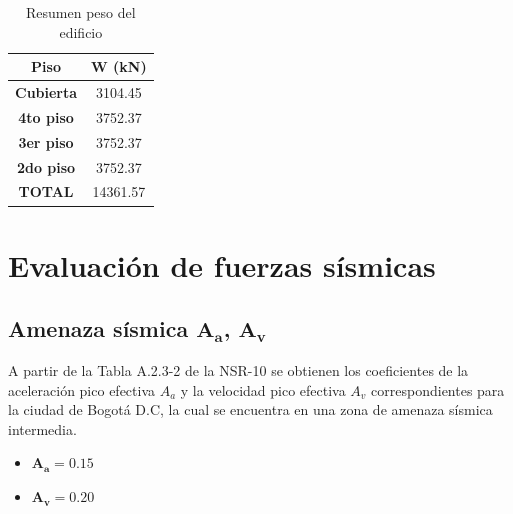 \documentclass[12pt]{article}
\begin{document}
\begin{table}[H]
  \centering
    \begin{tabular}{|c|c|}
    \hline
    \rowcolor[rgb]{ .2,  .247,  .31} \textcolor[rgb]{ 1,  1,  1}{\textbf{Piso}} & \multicolumn{1}{c|}{\textcolor[rgb]{ 1,  1,  1}{\textbf{W (kN)}}} \bigstrut\\
    \hline
    \rowcolor[rgb]{ .2,  .247,  .31} \textcolor[rgb]{ 1,  1,  1}{\textbf{Cubierta}} & \cellcolor[rgb]{ 1,  1,  1}3104.45 \bigstrut\\
    \hline
    \rowcolor[rgb]{ .2,  .247,  .31} \textcolor[rgb]{ 1,  1,  1}{\textbf{4to piso}} & \cellcolor[rgb]{ 1,  1,  1}3752.37 \bigstrut\\
    \hline
    \rowcolor[rgb]{ .2,  .247,  .31} \textcolor[rgb]{ 1,  1, 1}{\textbf{3er piso}} & \cellcolor[rgb]{ 1,  1,  1}3752.37 \bigstrut\\
    \hline
    \rowcolor[rgb]{ .2,  .247,  .31} \textcolor[rgb]{ 1,  1,  1}{\textbf{2do piso}} & \cellcolor[rgb]{ 1,  1,  1}3752.37 \bigstrut\\
    \hline
    \rowcolor[rgb]{ .2,  .247,  .31} \textcolor[rgb]{ 1,  1,  1}{\textbf{TOTAL}} & \cellcolor[rgb]{ 1,  1,  1}14361.57 \bigstrut\\
    \hline
    \end{tabular}%
  \caption{Resumen peso del edificio}
  \label{tab:ResumenWEd}%
\end{table}%




\section{Evaluación de fuerzas sísmicas}
 \subsection{Amenaza sísmica $\mathbf{A_{a}}$, $\mathbf{A_{v}}$}
 A partir de la Tabla A.2.3-2 de la NSR-10 se obtienen los coeficientes de la aceleración pico efectiva  $A_{a}$ y la velocidad pico efectiva $A_{v}$ correspondientes para la ciudad de Bogotá D.C, la cual se encuentra en una zona de amenaza sísmica intermedia.
 \begin{itemize}
     \item $\mathbf{A_{a}}=0.15$
     \item $\mathbf{A_{v}}=0.20$
     
 \end{itemize}
 
\end{document}
